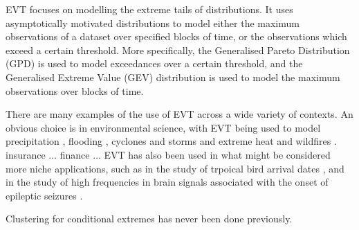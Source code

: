 \documentclass{article}
\numberwithin{equation}{section}
\begin{document}
EVT focuses on modelling the extreme tails of distributions.
It uses asymptotically motivated distributions to model either the maximum observations of a dataset over specified blocks of time, or the observations which exceed a certain threshold. 
More specifically, the Generalised Pareto Distribution (GPD) is used to model exceedances over a certain threshold, and the Generalised Extreme Value (GEV) distribution is used to model the maximum observations over blocks of time.


There are many examples of the use of EVT across a wide variety of contexts. 
An obvious choice is in environmental science, with EVT being used to model precipitation , flooding , cyclones and storms  and extreme heat and wildfires . 
insurance $\ldots$
finance $\ldots$
EVT has also been used in what might be considered more niche applications, such as in the study of trpoical bird arrival dates , and in the study of high frequencies in brain signals associated with the onset of epileptic seizures . 


Clustering for conditional extremes has never been done previously.
\end{document}
